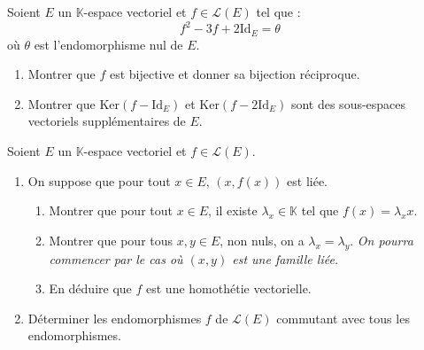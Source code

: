 \documentclass[a4paper,twoside,french,11pt]{VcCours}
\begin{document}
\begin{Exercice}{} Soient $E$ un $\mathbb{K}$-espace vectoriel et $f \in \mathcal{L}(E)$ tel que :
    \[
    f^2 - 3f + 2 \textrm{Id}_E = \theta
    \]
où $\theta$ est l'endomorphisme nul de $E$.
    \begin{enumerate}
      \item Montrer que $f$ est bijective et donner sa bijection réciproque.
      \item Montrer que $\textrm{Ker}(f - \textrm{Id}_E)$ et $\textrm{Ker}(f - 2\textrm{Id}_E)$ sont des sous-espaces vectoriels supplémentaires de $E$.
    \end{enumerate}
\end{Exercice}



\begin{Exercice}[$\bigstar$] Soient $E$ un $\mathbb{K}$-espace vectoriel et $f \in \mathcal{L}(E)$.

\begin{enumerate}
\item On suppose que pour tout $x \in E$, $(x, f(x))$ est liée.
\begin{enumerate}
\item Montrer que pour tout $x \in E$, il existe $\lambda_x \in \mathbb{K}$ tel que $f(x)= \lambda_x x$.
\item Montrer que pour tous $x,y \in E$, non nuls, on a $\lambda_x = \lambda_y$. \textit{On pourra commencer par le cas où $(x,y)$ est une famille liée.}
\item En déduire que $f$ est une homothétie vectorielle.
\end{enumerate}
\item Déterminer les endomorphismes $f$ de $\mathcal{L}(E)$ commutant avec tous les endomorphismes.
\end{enumerate}
\end{Exercice} 








%
%
%
%
%
%
%
%
\end{document}
